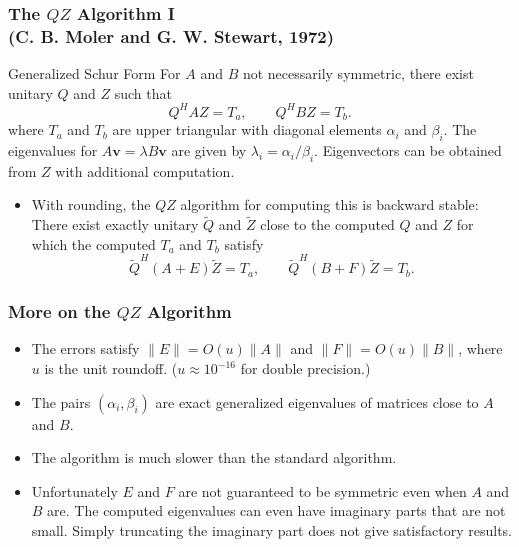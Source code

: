 \documentclass[landscape]{beamer}
\renewcommand{\vec}[1]{\bm{#1}}
\newcommand{\comm}[1]{\added[comment={#1}]{}}
\begin{document}
\begin{frame}
  \frametitle{The $QZ$ Algorithm I \\
    (C. B. Moler and G. W. Stewart, 1972)}

\begin{block}{Generalized Schur Form}
  For $A$ and $B$ not necessarily symmetric, there exist unitary $Q$
  and $Z$ such that
  \begin{equation*}
    Q^H A Z = T_a, \qquad
    Q^H B Z = T_b.
  \end{equation*}
  where $T_a$ and $T_b$ are upper triangular with diagonal elements
  $\alpha_i$ and $\beta_i$.  The eigenvalues for
  $A\vec{v} = \lambda B\vec{v}$ are given by
  $\lambda_i = \alpha_{i}/\beta_{i}$.  Eigenvectors can be obtained from $Z$
  with additional computation.
\end{block}

\begin{itemize}
\item With rounding, the $QZ$ algorithm for computing this is backward
  stable: There exist exactly unitary $\tilde{Q}$ and $\tilde{Z}$
  close to the computed $Q$ and $Z$ for which the computed $T_a$ and
  $T_b$ satisfy
  \begin{equation*}
    \tilde{Q}^H (A+E) \tilde{Z} = T_a , \qquad
    \tilde{Q}^H (B+F) \tilde{Z} = T_b.
  \end{equation*}
\end{itemize}
\end{frame}

\begin{frame}
  \frametitle{More on the $QZ$ Algorithm\comm{also remove}}

  \begin{itemize}
  \item The errors satisfy $\|E\| = O(u)\|A\|$ and
    $\|F\| = O(u)\|B\|$, where $u$ is the unit roundoff.
    ($u\approx 10^{-16}$ for double precision.)
  \item The pairs $(\alpha_{i},\beta_{i})$ are exact generalized
    eigenvalues of matrices close to $A$ and $B$.
  \item The algorithm is much slower than the standard algorithm.
  \item Unfortunately $E$ and $F$ are not guaranteed to be symmetric
    even when $A$ and $B$ are.  The computed eigenvalues can even have
    imaginary parts that are not small.  Simply truncating the imaginary
    part does not give satisfactory results.
  \end{itemize}
\end{frame}
\end{document}

